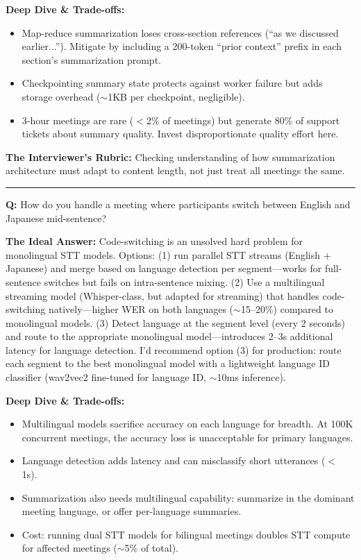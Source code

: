 \textbf{Deep Dive \& Trade-offs:}
\begin{itemize}
  \item Map-reduce summarization loses cross-section references (``as we discussed earlier...''). Mitigate by including a 200-token ``prior context'' prefix in each section's summarization prompt.
  \item Checkpointing summary state protects against worker failure but adds storage overhead ($\sim$1KB per checkpoint, negligible).
  \item 3-hour meetings are rare ($<$2\% of meetings) but generate 80\% of support tickets about summary quality. Invest disproportionate quality effort here.
\end{itemize}

\textbf{The Interviewer's Rubric:} Checking understanding of how summarization architecture must adapt to content length, not just treat all meetings the same.

\bigskip\hrule\bigskip

\textbf{Q:} How do you handle a meeting where participants switch between English and Japanese mid-sentence?

\textbf{The Ideal Answer:} Code-switching is an unsolved hard problem for monolingual STT models. Options: (1) run parallel STT streams (English + Japanese) and merge based on language detection per segment---works for full-sentence switches but fails on intra-sentence mixing. (2) Use a multilingual streaming model (Whisper-class, but adapted for streaming) that handles code-switching natively---higher WER on both languages ($\sim$15--20\%) compared to monolingual models. (3) Detect language at the segment level (every 2 seconds) and route to the appropriate monolingual model---introduces 2--3s additional latency for language detection. I'd recommend option (3) for production: route each segment to the best monolingual model with a lightweight language ID classifier (wav2vec2 fine-tuned for language ID, $\sim$10ms inference).

\textbf{Deep Dive \& Trade-offs:}
\begin{itemize}
  \item Multilingual models sacrifice accuracy on each language for breadth. At 100K concurrent meetings, the accuracy loss is unacceptable for primary languages.
  \item Language detection adds latency and can misclassify short utterances ($<$ 1s).
  \item Summarization also needs multilingual capability: summarize in the dominant meeting language, or offer per-language summaries.
  \item Cost: running dual STT models for bilingual meetings doubles STT compute for affected meetings ($\sim$5\% of total).
\end{itemize}

